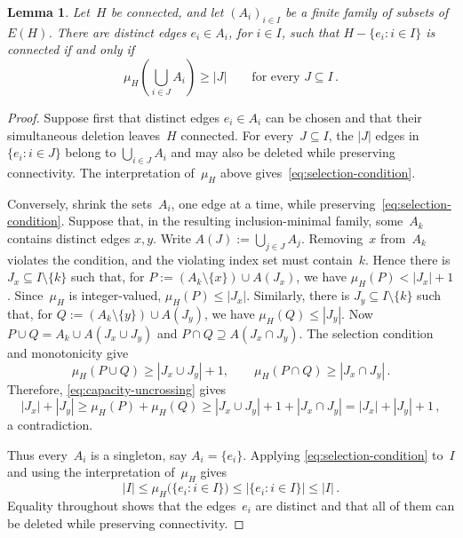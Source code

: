 \documentclass[12pt,reqno,a4paper]{amsart}
\newtheorem{lemma}[theorem]{Lemma}
\begin{document}
\begin{lemma}\label{lem:connected-selection}
  Let~$H$ be connected, and let $(A_i)_{i \in I}$ be a finite family of subsets
  of~$E(H)$. 
  There are distinct edges $e_i \in A_i$, for $i \in I$, such that $H - \{e_i
  \colon i \in I\}$ is connected if and only if
  \begin{equation}
  \label{eq:selection-condition}
    \mu_H \left(\bigcup_{i \in J} A_i \right) \ge |J|
      \qquad \text{for every } J \subseteq I \, .
  \end{equation}
\end{lemma}
\begin{proof}
  Suppose first that distinct edges $e_i \in A_i$ can be chosen and that their
  simultaneous deletion leaves~$H$ connected. 
  For every~$J \subseteq I$, the $|J|$ edges in $\{e_i \colon i \in J\}$ belong
  to $\bigcup_{i \in J} A_i$ and may also be deleted while preserving
  connectivity. 
  The interpretation of~$\mu_H$ above gives~\eqref{eq:selection-condition}.

  Conversely, shrink the sets~$A_i$, one edge at a time, while
  preserving~\eqref{eq:selection-condition}. 
  Suppose that, in the resulting inclusion-minimal family, some~$A_k$ contains
  distinct edges $x,y$.
  Write $A(J) := \bigcup_{j \in J} A_j$.
  Removing~$x$ from~$A_k$ violates the condition, and the violating index set
  must contain~$k$. 
  Hence there is $J_x \subseteq I \setminus \{k\}$ such that, for
  $P := (A_k \setminus \{x\}) \cup A(J_x)$, we have $\mu_H(P) < |J_x| + 1$.
  Since~$\mu_H$ is integer-valued, $\mu_H(P)\le|J_x|$. 
  Similarly, there is $J_y \subseteq I \setminus \{k\}$ such that, for $Q :=
  (A_k \setminus \{y\}) \cup A(J_y)$, we have $\mu_H(Q) \le |J_y|$.
  Now $P \cup Q = A_k \cup A(J_x \cup J_y)$ and $P \cap Q \supseteq A(J_x \cap
  J_y)$.
  The selection condition and monotonicity give
  \[
    \mu_H(P \cup Q) \ge |J_x \cup J_y| + 1,
    \qquad
    \mu_H(P \cap Q) \ge |J_x \cap J_y| \, .
  \]
  Therefore, \eqref{eq:capacity-uncrossing} gives
  \[
    |J_x| + |J_y| \ge \mu_H(P) + \mu_H(Q)
                  \ge |J_x \cup J_y| + 1 + |J_x \cap J_y|
                  = |J_x| + |J_y| + 1 \, ,
  \]
  a contradiction.

  Thus every~$A_i$ is a singleton, say $A_i=\{e_i\}$. 
  Applying \eqref{eq:selection-condition} to~$I$ and using the interpretation
  of~$\mu_H$ gives
  \[
    |I| \le \mu_H \bigl(\{e_i \colon i \in I\}\bigr)
      \le |\{e_i \colon i \in I\}| \le |I| \, .
  \]
  Equality throughout shows that the edges~$e_i$ are distinct and that all of
  them can be deleted while preserving connectivity.
\end{proof}
\end{document}
